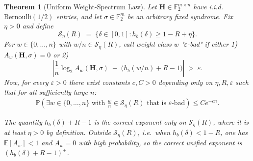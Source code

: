 \documentclass[journal,10pt,onecolumn]{IEEEtran}
\newtheorem{theorem}{Theorem}
\newcommand{\Fb}{\mathbb{F}}
\newcommand{\Eb}{\mathbb{E}}
\newcommand{\Pb}{\mathbb{P}}
\newcommand{\Hb}{h_b}
\newcommand{\Seta}{\mathcal{S}}
\newcommand{\eps}{\varepsilon}
\newcommand{\Hm}{\mathbf{H}}
\begin{document}
\begin{theorem}[Uniform Weight-Spectrum Law]
\label{thm:spectrum}
Let $\Hm \in\Fb_2^{m\times n}$ have i.i.d.\ $\mathrm{Bernoulli}(1/2)$
entries, and let $\sigma\in\Fb_2^m$ be an arbitrary fixed syndrome.
Fix $\eta>0$ and define
\[
    \Seta_\eta(R)
    \;=\;
    \{\delta\in[0,1]:\Hb(\delta)\ge 1-R+\eta\}.
\]
For $w\in\{0,\ldots,n\}$ with $w/n\in\Seta_\eta(R)$, call weight
class $w$ \emph{"$\varepsilon$-bad"} if either 1) $A_w(\Hm,\sigma)=0$ or 2)
\[
    \left|\frac{1}{n}\log_2 A_w(\Hm,\sigma)
    \;-\;\bigl(\Hb(w/n)+R-1\bigr)\right|
    \;>\;\varepsilon.
\]
Now, for every $\eps>0$ there exist constants $c,C>0$
depending only on $\eta,R,\eps$ such that for all sufficiently large $n$:
\begin{align}
    \Pb\!\left(
    \exists w\in\{0,\ldots,n\}
    \text{ with }
    \tfrac{w}{n}\in\Seta_\eta(R)
    \text{ that is $\varepsilon$-bad}
    \right)
    \le
    Ce^{-cn}.
    \label{eq:spectrum_conc}
\end{align}

The quantity $\Hb(\delta)+R-1$ is the correct exponent only
on $\Seta_\eta(R)$, where it is at least $\eta>0$ by definition.
Outside $\Seta_\eta(R)$, i.e.\ when $\Hb(\delta)<1-R$,
one has $\Eb[A_w]<1$ and $A_w=0$ with high probability,
so the correct unified exponent is $(\Hb(\delta)+R-1)^+$.

\end{theorem}
\end{document}
